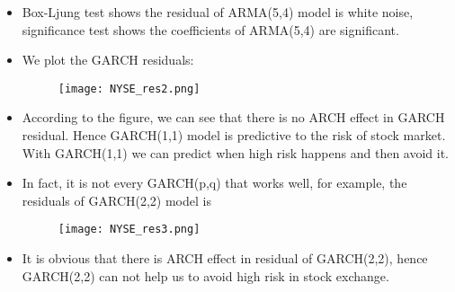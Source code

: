 \documentclass[10 pt]{beamer}
\begin{document}
\begin{frame}
	
	
	\begin{itemize}

		\item Box-Ljung test shows the residual of ARMA(5,4) model is white noise, significance test shows the coefficients of ARMA(5,4) are significant.
		\item We plot the GARCH residuals:
		\begin {figure}[h]
		\centering
		\texttt{[image: NYSE\_res2.png]}
		\end {figure}
		\item According to the figure, we can see that there is no ARCH effect in GARCH residual. Hence GARCH(1,1) model is predictive to the risk of stock market. With GARCH(1,1) we can predict when high risk happens and then avoid it.
		
	\end{itemize}
\end{frame}

\begin{frame}
	
	
	\begin{itemize}
\item In fact, it is not every GARCH(p,q) that works well, for example, the residuals of GARCH(2,2) model is
\begin {figure}[h]
\centering
\texttt{[image: NYSE\_res3.png]}
\end {figure}
\item It is obvious that there is ARCH effect in residual of GARCH(2,2), hence GARCH(2,2) can not help us to avoid high risk in stock exchange.
	\end{itemize}
\end{frame}
\end{document}
